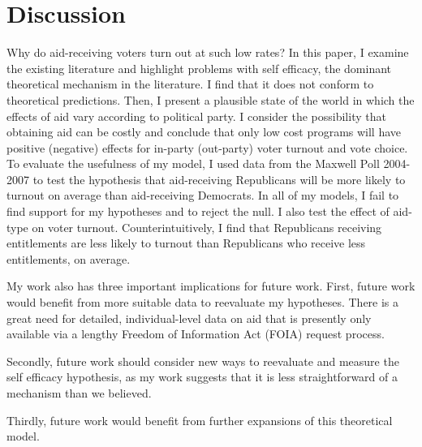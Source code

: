 \documentclass[12pt]{paper}
\begin{document}
\section{Discussion}
Why do aid-receiving voters turn out at such low rates? In this paper, I examine the existing literature and highlight problems with self efficacy, the dominant theoretical mechanism in the literature. I find that it does not conform to theoretical predictions. Then, I present a plausible state of the world in which the effects of aid vary according to political party. I consider the possibility that obtaining aid can be costly and conclude that only low cost programs will have positive (negative) effects for in-party (out-party) voter turnout and vote choice. To evaluate the usefulness of my model, I used data from the Maxwell Poll 2004-2007 to test the hypothesis that aid-receiving Republicans will be more likely to turnout on average than aid-receiving Democrats. In all of my models, I fail to find support for my hypotheses and to reject the null. I also test the effect of aid-type on voter turnout. Counterintuitively, I find that Republicans receiving entitlements are less likely to turnout than Republicans who receive less entitlements, on average.

My work also has three important implications for future work. First, future work would benefit from more suitable data to reevaluate my hypotheses. There is a great need for detailed, individual-level data on aid that is presently only available via a lengthy Freedom of Information Act (FOIA) request process. 

Secondly, future work should consider new ways to reevaluate and measure the self efficacy hypothesis, as my work suggests that it is less straightforward of a mechanism than we believed. 

Thirdly, future work would benefit from further expansions of this theoretical model.
%
%

\clearpage
\end{document}

